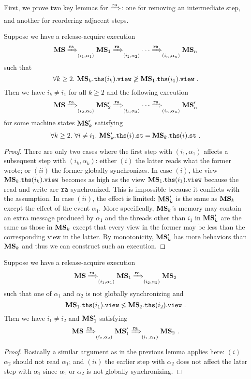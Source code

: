 First, we prove two key lemmas for $\xRightarrow{\texttt{ra}}$: one for removing an
intermediate step, and another for reordering adjacent steps.
\begin{lemma}
\label{lem:drf-key-remove}
Suppose we have a release-acquire execution 
\[{\mathbf{MS}} \xRightarrow{\texttt{ra}}_{(i_1,\alpha_1)} {\mathbf{MS}}_1 \xRightarrow{\texttt{ra}}_{(i_2,\alpha_2)}
\cdots \xRightarrow{\texttt{ra}}_{(i_n,\alpha_n)} {\mathbf{MS}}_n \]
such that
\[
\forall k \ge 2.~ {\mathbf{MS}}_k.\mathtt{ths}(i_k).\texttt{view}  \not\geq {\mathbf{MS}}_1.\mathtt{ths}(i_1).\texttt{view} ~.
\]
Then we have $i_k \neq i_1$ for all $k \ge 2$ and the following execution
\[
{\mathbf{MS}} \xRightarrow{\texttt{ra}}_{(i_2,\alpha_2)} {\mathbf{MS}}'_2 \xRightarrow{\texttt{ra}}_{(i_3,\alpha_3)}
\cdots \xRightarrow{\texttt{ra}}_{(i_n,\alpha_n)} {\mathbf{MS}}'_n
\]
for some machine states ${\mathbf{MS}}'_k$ satisfying
\[
\forall k\ge 2.~\forall i \neq i_1.~ {\mathbf{MS}}'_k.\mathtt{ths}(i).\texttt{st} = {\mathbf{MS}}_k.\mathtt{ths}(i).\texttt{st}~.
\]
\end{lemma}
\begin{proof}
There are only two cases where the first step with
$(i_1,\alpha_1)$ affects a subsequent step with $(i_k,\alpha_k)$:
either $(i)$ the latter reads what the former wrote; or $(ii)$ the
former globally synchronizes.  In case $(i)$, the view
${\mathbf{MS}}_k.\mathtt{ths}(i_k).\texttt{view}$ becomes as high as the view
${\mathbf{MS}}_1.\mathtt{ths}(i_1).\texttt{view}$ because the read and write are
$\texttt{ra}$-synchronized. This is impossible because it conflicts with the
assumption.  In case $(ii)$, the effect is limited: ${\mathbf{MS}}'_k$ is the
same as ${\mathbf{MS}}_k$ except the effect of the event $\alpha_1$.  More
specifically, ${\mathbf{MS}}_k$'s memory may contain an extra message
produced by $\alpha_1$ and the threads other than $i_1$ in ${\mathbf{MS}}'_k$
are the same as those in ${\mathbf{MS}}_k$ except that every view in the
former may be less than the corresponding view in the latter.  By
monotonicity, ${\mathbf{MS}}'_k$ has more behaviors than ${\mathbf{MS}}_k$ and thus
we can construct such an execution.
\end{proof}

\begin{lemma}
\label{lem:drf-key-reorder}
Suppose we have a release-acquire execution 
\[{\mathbf{MS}} \xRightarrow{\texttt{ra}}_{(i_1,\alpha_1)} {\mathbf{MS}}_1 \xRightarrow{\texttt{ra}}_{(i_2,\alpha_2)} {\mathbf{MS}}_2 \]
such that one of $\alpha_1$ and $\alpha_2$ is not globally synchronizing and
\[
{\mathbf{MS}}_1.\mathtt{ths}(i_1).\texttt{view} \not\leq {\mathbf{MS}}_2.\mathtt{ths}(i_2).\texttt{view} ~.
\]
Then we have $i_1 \neq i_2$ and ${\mathbf{MS}}_1'$ satisfying
\[
{\mathbf{MS}} \xRightarrow{\texttt{ra}}_{(i_2,\alpha_2)} {\mathbf{MS}}'_1 \xRightarrow{\texttt{ra}}_{(i_1,\alpha_1)} {\mathbf{MS}}_2 ~.
\]
\end{lemma}
\begin{proof}
Basically a similar argument as in the previous lemma applies here:
$(i)$ $\alpha_2$ should not read $\alpha_1$; and $(ii)$ the earlier
step with $\alpha_2$ does not affect the later step with
$\alpha_1$ since $\alpha_1$ or $\alpha_2$ is not globally synchronizing.
\end{proof}


